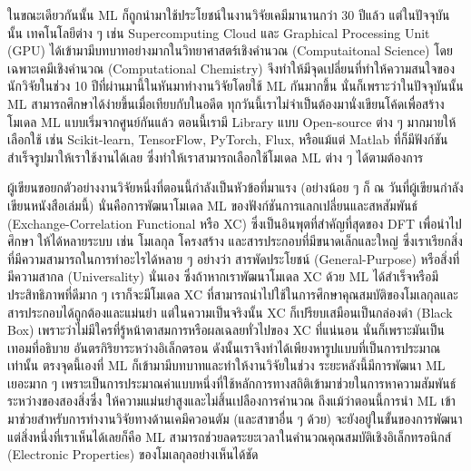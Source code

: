 ในขณะเดียวกันนั้น ML ก็ถูกนำมาใช้ประโยชน์ในงานวิจัยเคมีมานานกว่า 30 ปีแล้ว แต่ในปัจจุบันนั้น เทคโนโลยีต่าง ๆ เช่น Supercomputing Cloud และ 
Graphical Processing Unit (GPU) ได้เข้ามามีบทบาทอย่างมากในวิทยาศาสตร์เชิงคำนวณ (Computaitonal Science) โดยเฉพาะเคมีเชิงคำนวณ 
(Computational Chemistry) จึงทำให้มีจุดเปลี่ยนที่ทำให้ความสนใจของนักวิจัยในช่วง 10 ปีที่ผ่านมานี้ในหันมาทำงานวิจัยโดยใช้ ML กันมากขึ้น 
นั่นก็เพราะว่าในปัจจุบันนั้น ML สามารถศึกษาได้ง่ายขึ้นเมื่อเทียบกับในอดีต ทุกวันนี้เราไม่จำเป็นต้องมานั่งเขียนโค้ดเพื่อสร้างโมเดล ML แบบเริ่มจากศูนย์กันแล้ว 
ตอนนี้เรามี Library แบบ Open-source ต่าง ๆ มากมายให้เลือกใช้ เช่น Scikit-learn\autocite{scikit-learn}, 
TensorFlow\autocite{tensorflow2015-whitepaper}, PyTorch\autocite{NEURIPS2019_9015}, Flux\autocite{innes2018}, 
หรือแม้แต่ Matlab\autocite{MATLAB:2010} ที่ก็มีฟังก์ชันสำเร็จรูปมาให้เราใช้งานได้เลย ซึ่งทำให้เราสามารถเลือกใช้โมเดล ML ต่าง ๆ ได้ตามต้องการ

ผู้เขียนขอยกตัวอย่างงานวิจัยหนึ่งที่ตอนนี้กำลังเป็นหัวข้อที่มาแรง (อย่างน้อย ๆ ก็ ณ วันที่ผู้เขียนกำลังเขียนหนังสือเล่มนี้) นั่นคือการพัฒนาโมเดล ML 
ของฟังก์ชันการแลกเปลี่ยนและสหสัมพันธ์ (Exchange-Correlation Functional หรือ XC) ซึ่งเป็นอินพุตที่สำคัญที่สุดของ DFT เพื่อนำไปศึกษา%
ให้ได้หลายระบบ เช่น โมเลกุล โครงสร้าง และสารประกอบที่มีขนาดเล็กและใหญ่ ซึ่งเราเรียกสิ่งที่มีความสามารถในการทำอะไรได้หลาย ๆ อย่างว่า%
สารพัดประโยชน์ (General-Purpose) หรือสิ่งที่มีความสากล (Universality) นั่นเอง ซึ่งถ้าหากเราพัฒนาโมเดล XC ด้วย ML ได้สำเร็จหรือมี%
ประสิทธิภาพที่ดีมาก ๆ เราก็จะมีโมเดล XC ที่สามารถนำไปใช้ในการศึกษาคุณสมบัติของโมเลกุลและสารประกอบได้ถูกต้องและแม่นยำ แต่ในความเป็นจริงนั้น 
XC ก็เปรียบเสมือนเป็นกล่องดำ (Black Box) เพราะว่าไม่มีใครที่รู้หน้าตาสมการหรือผลเฉลยทั่วไปของ XC ที่แน่นอน นั่นก็เพราะมันเป็นเทอมที่อธิบาย%
อันตรกิริยาระหว่างอิเล็กตรอน ดังนั้นเราจึงทำได้เพียงหารูปแบบที่เป็นการประมาณเท่านั้น ตรงจุดนี้เองที่ ML ก็เข้ามามีบทบาทและทำให้งานวิจัยในช่วง%
ระยะหลังนี้มีการพัฒนา ML เยอะมาก ๆ เพราะเป็นการประมาณค่าแบบหนึ่งที่ใช้หลักการทางสถิติเข้ามาช่วยในการหาความสัมพันธ์ระหว่างของสองสิ่งซึ่ง%
ให้ความแม่นยำสูงและไม่สิ้นเปลืองการคำนวณ ถึงแม้ว่าตอนนี้การนำ ML เข้ามาช่วยสำหรับการทำงานวิจัยทางด้านเคมึควอนตัม (และสาขาอื่น ๆ ด้วย) 
จะยังอยู่ในขั้นของการพัฒนา แต่สิ่งหนึ่งที่เราเห็นได้เลยก็คือ ML สามารถช่วยลดระยะเวลาในคำนวณคุณสมบัติเชิงอิเล็กทรอนิกส์ (Electronic Properties) 
ของโมเลกุลอย่างเห็นได้ชัด

